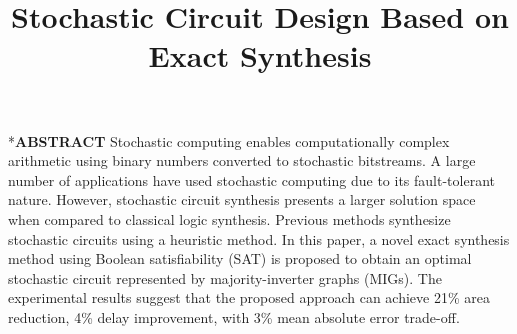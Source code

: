 \documentclass[conference,letterpaper]{IEEEtran}
\makeatletter
\renewcommand{\section}{\@startsection{section}{1}{0mm}
    {-\baselineskip}{0.001\baselineskip}{\bf\leftline}}
\makeatother
\begin{document}
\title{ \Large\textbf{ Stochastic Circuit Design Based on Exact Synthesis}\vspace{-1.2em} }
\author{
}

\maketitle
\section*{\textbf{\large ABSTRACT}}
Stochastic computing enables computationally complex arithmetic using binary numbers converted to stochastic bitstreams. 
A large number of applications have used stochastic computing due to its fault-tolerant nature. 
However, stochastic circuit synthesis presents a larger solution space when compared to classical logic synthesis.
Previous methods synthesize stochastic circuits using a heuristic method. In this paper, a novel exact synthesis method using Boolean satisfiability (SAT) is proposed to obtain an optimal stochastic circuit represented by majority-inverter graphs (MIGs). The experimental results suggest that the proposed approach can achieve 21\% area reduction, 4\% delay improvement, with 3\% mean absolute error trade-off.    
\vspace{2ex}

\end{document}
